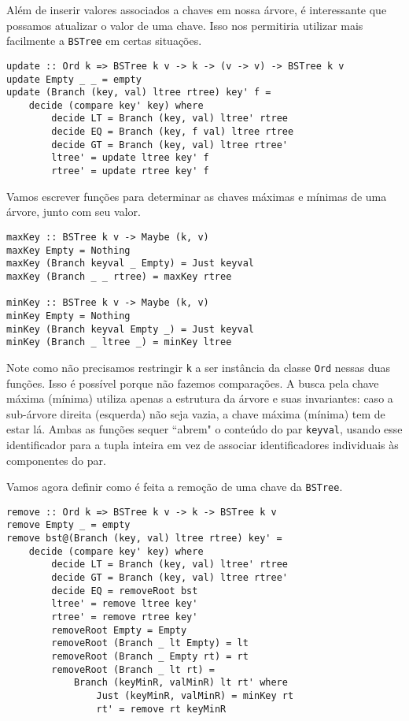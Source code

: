 \documentclass[a4paper]{article}
\begin{document}
Além de inserir valores associados a chaves em nossa árvore, é interessante que possamos atualizar o valor de uma chave.
Isso nos permitiria utilizar mais facilmente a \texttt{BSTree} em certas situações.

\begin{verbatim}
update :: Ord k => BSTree k v -> k -> (v -> v) -> BSTree k v
update Empty _ _ = empty
update (Branch (key, val) ltree rtree) key' f =
	decide (compare key' key) where
		decide LT = Branch (key, val) ltree' rtree
		decide EQ = Branch (key, f val) ltree rtree
		decide GT = Branch (key, val) ltree rtree'
		ltree' = update ltree key' f
		rtree' = update rtree key' f
\end{verbatim}

Vamos escrever funções para determinar as chaves máximas e mínimas de uma árvore, junto com seu valor.

\begin{verbatim}
maxKey :: BSTree k v -> Maybe (k, v)
maxKey Empty = Nothing
maxKey (Branch keyval _ Empty) = Just keyval
maxKey (Branch _ _ rtree) = maxKey rtree

minKey :: BSTree k v -> Maybe (k, v)
minKey Empty = Nothing
minKey (Branch keyval Empty _) = Just keyval
minKey (Branch _ ltree _) = minKey ltree
\end{verbatim}

Note como não precisamos restringir \texttt{k} a ser instância da classe \texttt{Ord} nessas duas funções.
Isso é possível porque não fazemos comparações.
A busca pela chave máxima (mínima) utiliza apenas a estrutura da árvore e suas invariantes: caso a sub-árvore direita (esquerda) não seja vazia, a chave máxima (mínima) tem de estar lá.
Ambas as funções sequer ``abrem" o conteúdo do par \texttt{keyval}, usando esse identificador para a tupla inteira em vez de associar identificadores individuais às componentes do par.

Vamos agora definir como é feita a remoção de uma chave da \texttt{BSTree}.

\pagebreak

\begin{verbatim}
remove :: Ord k => BSTree k v -> k -> BSTree k v
remove Empty _ = empty
remove bst@(Branch (key, val) ltree rtree) key' =
	decide (compare key' key) where
		decide LT = Branch (key, val) ltree' rtree
		decide GT = Branch (key, val) ltree rtree'
		decide EQ = removeRoot bst
		ltree' = remove ltree key'
		rtree' = remove rtree key'
		removeRoot Empty = Empty
		removeRoot (Branch _ lt Empty) = lt
		removeRoot (Branch _ Empty rt) = rt
		removeRoot (Branch _ lt rt) =
			Branch (keyMinR, valMinR) lt rt' where
				Just (keyMinR, valMinR) = minKey rt
				rt' = remove rt keyMinR
\end{verbatim}
\end{document}
